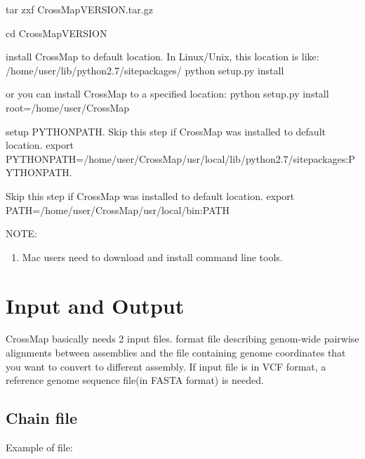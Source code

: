 \documentclass[letterpaper,10pt,english]{sphinxmanual}
\begin{document}
\begin{sphinxVerbatim}[commandchars=\\\{\}]
\PYGZdl{} tar zxf CrossMap\PYGZhy{}VERSION.tar.gz

\PYGZdl{} cd CrossMap\PYGZhy{}VERSION

\PYGZsh{} install CrossMap to default location. In Linux/Unix, this location is like:
\PYGZsh{} /home/user/lib/python2.7/site\PYGZhy{}packages/
\PYGZdl{} python setup.py install

\PYGZsh{} or you can install CrossMap to a specified location:
\PYGZdl{} python setup.py install \PYGZhy{}\PYGZhy{}root=/home/user/CrossMap

\PYGZsh{} setup PYTHONPATH. Skip this step if CrossMap was installed to default location.
\PYGZdl{} export PYTHONPATH=/home/user/CrossMap/usr/local/lib/python2.7/site\PYGZhy{}packages:\PYGZdl{}PYTHONPATH.

\PYGZsh{} Skip this step if CrossMap was installed to default location.
\PYGZdl{} export PATH=/home/user/CrossMap/usr/local/bin:\PYGZdl{}PATH
\end{sphinxVerbatim}

NOTE:
\begin{enumerate}
\item {} 
Mac users need to download and install 
command line tools.

\end{enumerate}


\chapter{Input and Output}
\label{\detokenize{index:input-and-output}}
CrossMap basically needs 2 input files.  
format file describing genom-wide pairwise alignments between assemblies and the file  containing
genome coordinates that you want to convert to different assembly. If input file is in VCF
format, a reference genome sequence file(in FASTA format) is needed.


\section{Chain file}
\label{\detokenize{index:chain-file}}
Example of  file:
\end{document}
